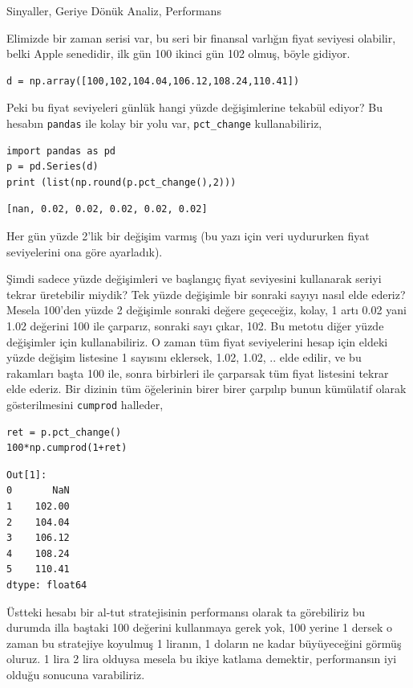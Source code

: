 \documentclass[12pt,fleqn]{article}\usepackage{../../common}
\begin{document}
Sinyaller, Geriye Dönük Analiz, Performans

Elimizde bir zaman serisi var, bu seri bir finansal varlığın fiyat seviyesi
olabilir, belki Apple senedidir, ilk gün 100 ikinci gün 102 olmuş, böyle
gidiyor.

\begin{verbatim}
d = np.array([100,102,104.04,106.12,108.24,110.41])
\end{verbatim}

Peki bu fiyat seviyeleri günlük hangi yüzde değişimlerine tekabül ediyor?  Bu
hesabın \verb!pandas! ile kolay bir yolu var, \verb!pct_change! kullanabiliriz,

\begin{verbatim}
import pandas as pd
p = pd.Series(d)
print (list(np.round(p.pct_change(),2)))
\end{verbatim}

\begin{verbatim}
[nan, 0.02, 0.02, 0.02, 0.02, 0.02]
\end{verbatim}

Her gün yüzde 2'lik bir değişim varmış (bu yazı için veri uydururken fiyat
seviyelerini ona göre ayarladık).

Şimdi sadece yüzde değişimleri ve başlangıç fiyat seviyesini kullanarak seriyi
tekrar üretebilir miydik? Tek yüzde değişimle bir sonraki sayıyı nasıl elde
ederiz?  Mesela 100'den yüzde 2 değişimle sonraki değere geçeceğiz, kolay, 1
artı 0.02 yani 1.02 değerini 100 ile çarparız, sonraki sayı çıkar, 102. Bu
metotu diğer yüzde değişimler için kullanabiliriz. O zaman tüm fiyat
seviyelerini hesap için eldeki yüzde değişim listesine 1 sayısını eklersek,
1.02, 1.02, .. elde edilir, ve bu rakamları başta 100 ile, sonra birbirleri ile
çarparsak tüm fiyat listesini tekrar elde ederiz. Bir dizinin tüm öğelerinin
birer birer çarpılıp bunun kümülatif olarak gösterilmesini \verb!cumprod!
halleder,

\begin{verbatim}
ret = p.pct_change()
100*np.cumprod(1+ret)
\end{verbatim}

\begin{verbatim}
Out[1]: 
0       NaN
1    102.00
2    104.04
3    106.12
4    108.24
5    110.41
dtype: float64
\end{verbatim}

Üstteki hesabı bir al-tut stratejisinin performansı olarak ta görebiliriz bu
durumda illa baştaki 100 değerini kullanmaya gerek yok, 100 yerine 1 dersek o
zaman bu stratejiye koyulmuş 1 liranın, 1 doların ne kadar büyüyeceğini görmüş
oluruz.  1 lira 2 lira olduysa mesela bu ikiye katlama demektir, performansın
iyi olduğu sonucuna varabiliriz.
\end{document}

